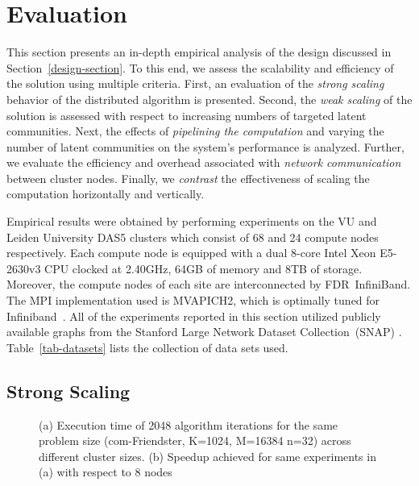 \section{Evaluation}

This section presents an in-depth empirical analysis of the design discussed in
Section~\ref{design-section}. To this end, we assess the scalability and
efficiency of the solution using multiple criteria.
%
First, an evaluation of the \textit{strong scaling} behavior of the distributed
algorithm is presented.
%
Second, the \textit{weak scaling} of the solution is assessed with respect to increasing
numbers of targeted latent communities.
%
Next, the effects of \textit{pipelining the computation} and varying the number of latent communities on the system's
performance is analyzed.
%
Further, we evaluate the efficiency and overhead associated with \textit{network
communication} between cluster nodes.
%
Finally, we \textit{contrast} the effectiveness of scaling the computation horizontally
and vertically.

Empirical results were obtained by performing experiments on the VU and
Leiden University
DAS5 clusters which consist of 68 and 24 compute nodes respectively. Each
compute node is equipped with a dual 8-core Intel Xeon E5-2630v3 CPU clocked
at 2.40GHz, 64GB of memory and 8TB of storage. Moreover, the compute nodes of
each site are interconnected by
FDR~InfiniBand. The MPI implementation used is MVAPICH2, which is optimally
tuned for Infiniband~\cite{mvapich}. All of the experiments reported in this section utilized
publicly available graphs from the Stanford Large Network Dataset
Collection~(SNAP) \cite{snapnets}. Table~\ref{tab-datasets} lists the
collection of data sets used.

\subsection{Strong Scaling}

\begin{figure}[b] %
  \centering
  \caption{(a) Execution time of 2048 algorithm iterations for the
  same problem size (com-Friendster, K=1024, M=16384 n=32) across different
  cluster sizes. (b) Speedup achieved for same experiments in (a) with respect to
  8 nodes}
  \label{fig-strong-scaling}
\end{figure}

